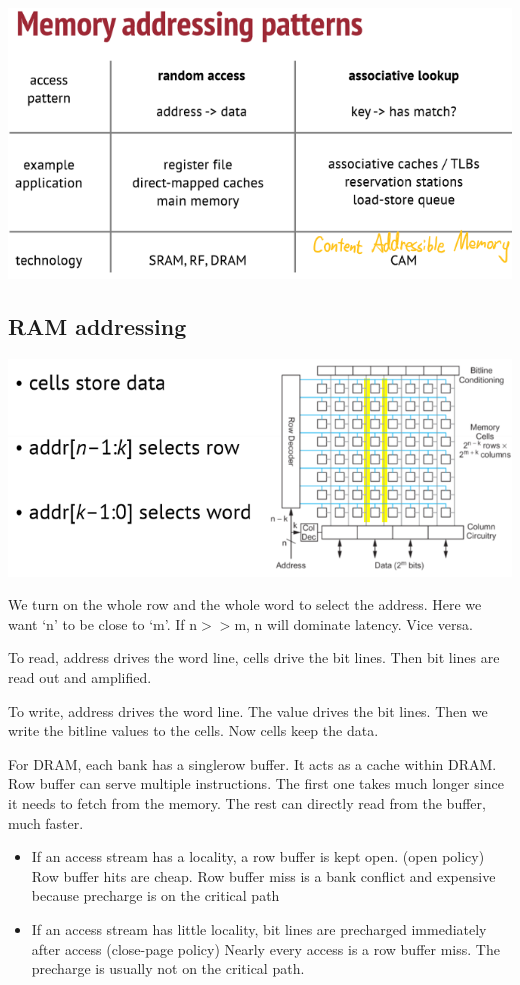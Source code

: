 \documentclass[letterpaper,12pt]{article}
\begin{document}
\includegraphics{./Image/Memory_addressing_patterns.png}

\subsection{RAM addressing}

\includegraphics{./Image/RAM_addressing.png}

We turn on the whole row and the whole word to select the address. Here we want `n' to be close to `m'. If n$>>$m, n will dominate latency. Vice versa.

To read, address drives the word line, cells drive the bit lines. Then bit lines are read out and amplified.

To write, address drives the word line. The value drives the bit lines. Then we write the bitline values to the cells. Now cells keep the data.

For DRAM, each bank has a single\-row buffer. It acts as a cache within DRAM.
Row buffer can serve multiple instructions. The first one takes much longer since it needs to fetch from the memory. The rest can directly read from the buffer, much faster.
\begin{itemize}
    \item If an access stream has a locality, a row buffer is kept open. (open policy)
          Row buffer hits are cheap. Row buffer miss is a bank conflict and expensive
          because precharge is on the critical path
    \item If an access stream has little locality, bit lines are precharged
          immediately after access (close-page policy)
          Nearly every access is a row buffer miss. The precharge is usually not on the critical path.
\end{itemize}
\end{document}
